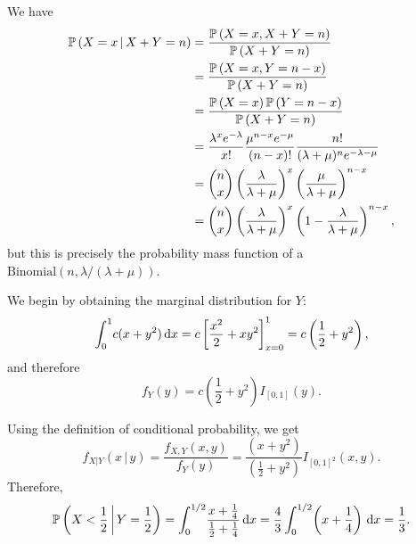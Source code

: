 \begin{ex}
  We have
  \begin{align*}
    \mathbb{P}\left(X=x \,\middle|\, X+Y=n\right)
     & =\frac{\mathbb{P}\left(X=x,X+Y=n\right)}{\mathbb{P}\left(X+Y=n\right)}                                                                               \\
     & =\frac{\mathbb{P}\left(X=x,Y=n-x\right)}{\mathbb{P}\left(X+Y=n\right)}                                                                               \\
     & =\frac{\mathbb{P}\left(X=x\right)\mathbb{P}\left(Y=n-x\right)}{\mathbb{P}\left(X+Y=n\right)}                                                                            \\
     & =\frac{\lambda^x e^{-\lambda}}{x!}\frac{\mu^{n-x} e^{-\mu}}{(n-x)!}\frac{n!}{(\lambda +\mu)^ne^{-\lambda-\mu}} \\
     & =\binom{n}{x}\left(\frac{\lambda}{\lambda+\mu}\right)^x\left(\frac{\mu}{\lambda+\mu} \right)^{n-x}             \\
     & =\binom{n}{x}\left(\frac{\lambda}{\lambda+\mu}\right)^x\left(1-\frac{\lambda}{\lambda+\mu} \right)^{n-x},
  \end{align*}
  but this is precisely the probability mass function of a
  $\text{Binomial}(n, \lambda/(\lambda+\mu))$.
\end{ex}

\begin{ex}
  We begin by obtaining the marginal distribution for $Y$:
  \[
    \int_0^1\! c(x+y^2)\,\mathrm{d}{x}
    =c\left[\frac{x^2}{2}+xy^2\right]_{x=0}^1
    =c\left(\frac{1}{2}+y^2\right),
  \]
  and therefore
  \[
    f_Y(y)=c\left(\frac{1}{2}+y^2\right)I_{[0,1]}(y).
  \]

  Using the definition of conditional probability, we get
  \[
    f_{X|Y}(x\,|\,y)
    =\frac{f_{X,Y}(x,y)}{f_Y(y)}
    =\frac{(x+y^2)}{\left(\frac{1}{2}+y^2\right)}I_{[0,1]^2}(x,y).
  \]
  Therefore,
  \[
    \mathbb{P}\left(X<\frac{1}{2} \,\middle|\, Y=\frac{1}{2}\right)
    =\int_0^{1/2}\!\frac{x+\frac{1}{4}}{\frac{1}{2}+\frac{1}{4}}\,\mathrm{d}{x}
    =\frac{4}{3}\int_0^{1/2}\!\left(x+\frac{1}{4}\right)\,\mathrm{d}{x}
    =\frac{1}{3}.
  \]
\end{ex}

